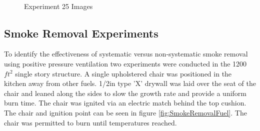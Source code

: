 \documentclass{article}
\begin{document}
\begin{figure}[H]
	\ContinuedFloat 
	\centering 
	 \ 
	\caption{Experiment 25 Images}
	\label{fig:Experiment25ImagesCont3} 
\end{figure}

\subsection{Smoke Removal Experiments}

To identify the effectiveness of systematic versus non-systematic smoke removal using positive pressure ventilation two experiments were conducted in the 1200 $ft^2$ single story structure. A single upholstered chair was positioned in the kitchen away from other fuels. 1/2in type 'X' drywall was laid over the seat of the chair and leaned along the sides to slow the growth rate and provide a uniform burn time. The chair was ignited via an electric match behind the top cushion. The chair and ignition point can be seen in figure \ref{fig:SmokeRemovalFuel}. The chair was permitted to burn until temperatures reached. 
\end{document}
